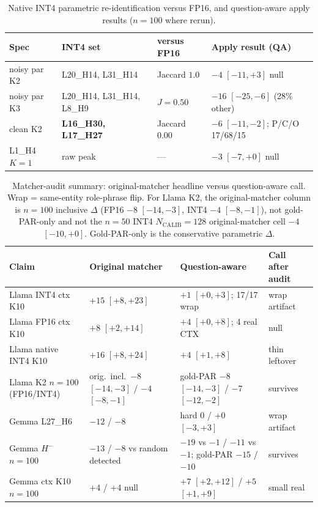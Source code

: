 \documentclass{article} %
\begin{document}
\begin{table}[h]
\caption{Native INT4 parametric re-identification versus FP16, and question-aware apply results ($n{=}100$ where rerun).}
\label{tab:native-id}
\centering\footnotesize
\begin{tabular}{p{1.35in}p{1.15in}p{0.9in}p{1.4in}}
\toprule
Spec & INT4 set & versus FP16 & Apply result (QA) \\
\midrule
noisy par K2 & L20\_H14, L31\_H14 & Jaccard $\mathbf{1.0}$ & $-4$ $[-11,+3]$ null \\
noisy par K3 & L20\_H14, L31\_H14, L8\_H9 & $J{=}0.50$ & $-16$ $[-25,-6]$ (28\% other) \\
clean K2 & \textbf{L16\_H30, L17\_H27} & Jaccard $\mathbf{0.00}$ & $-6$ $[-11,-2]$; P/C/O 17/68/15 \\
L1\_H4 $K{=}1$ & raw peak & --- & $-3$ $[-7,+0]$ null \\
\bottomrule
\end{tabular}
\end{table}

\begin{table}[h]
\caption{Matcher-audit summary: original-matcher headline versus question-aware call. Wrap = same-entity role-phrase flip. For Llama K2, the original-matcher column is $n{=}100$ inclusive $\Delta$ (FP16 $-8$ $[-14,-3]$, INT4 $-4$ $[-8,-1]$), not gold-PAR-only and not the $n{=}50$ INT4 $N_{\mathrm{CALIB}}{=}128$ original-matcher cell $-4$ $[-10,+0]$. Gold-PAR-only is the conservative parametric $\Delta$.}
\label{tab:artifact-summary}
\centering\scriptsize
\setlength{\tabcolsep}{2pt}
\begin{tabular}{lp{1.15in}p{1.45in}p{0.95in}}
\toprule
Claim & Original matcher & Question-aware & Call after audit \\
\midrule
Llama INT4 ctx K10 & $+15$ $[+8,+23]$ & $+1$ $[+0,+3]$; 17/17 wrap & wrap artifact \\
Llama FP16 ctx K10 & $+8$ $[+2,+14]$ & $+4$ $[+0,+8]$; 4 real CTX & null \\
Llama native INT4 K10 & $+16$ $[+8,+24]$ & $+4$ $[+1,+8]$ & thin leftover \\
Llama K2 $n{=}100$ (FP16/INT4) & orig.\ incl.\ $-8$ $[-14,-3]$ / $-4$ $[-8,-1]$ & gold-PAR $-8$ $[-14,-3]$ / $-7$ $[-12,-2]$ & survives \\
Gemma L27\_H6 & $-12$ / $-8$ & hard $0$ / $+0$ $[-3,+3]$ & wrap artifact \\
Gemma $H^{-}$ $n{=}100$ & $-13$ / $-8$ vs random detected & $-19$ vs $-1$ / $-11$ vs $-1$; gold-PAR $-15$ / $-10$ & survives \\
Gemma ctx K10 $n{=}100$ & $+4$ / $+4$ null & $+7$ $[+2,+12]$ / $+5$ $[+1,+9]$ & small real \\
\bottomrule
\end{tabular}
\end{table}
\end{document}
